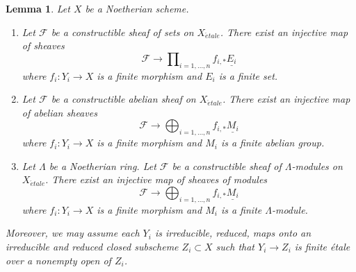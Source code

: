 \documentclass{amsart}
\theoremstyle{plain}
\newtheorem{lemma}[subsection]{Lemma}
\theoremstyle{definition}
\theoremstyle{remark}
\numberwithin{equation}{subsection}
\def\etale{{\acute{e}tale}}
\begin{document}
\begin{lemma}
\label{lemma-constructible-maps-into-constant}
Let $X$ be a Noetherian scheme.
\begin{enumerate}
\item Let $\mathcal{F}$ be a constructible sheaf of sets on $X_\etale$.
There exist an injective map of sheaves
$$
\mathcal{F} \longrightarrow
\prod\nolimits_{i = 1, \ldots, n} f_{i, *}\underline{E_i}
$$
where $f_i : Y_i \to X$ is a finite morphism and $E_i$ is a finite set.
\item Let $\mathcal{F}$ be a constructible abelian sheaf on $X_\etale$.
There exist an injective map of abelian sheaves
$$
\mathcal{F} \longrightarrow
\bigoplus\nolimits_{i = 1, \ldots, n} f_{i, *}\underline{M_i}
$$
where $f_i : Y_i \to X$ is a finite morphism and
$M_i$ is a finite abelian group.
\item Let $\Lambda$ be a Noetherian ring.
Let $\mathcal{F}$ be a constructible sheaf of $\Lambda$-modules on $X_\etale$.
There exist an injective map of sheaves of modules
$$
\mathcal{F} \longrightarrow
\bigoplus\nolimits_{i = 1, \ldots, n} f_{i, *}\underline{M_i}
$$
where $f_i : Y_i \to X$ is a finite morphism and
$M_i$ is a finite $\Lambda$-module.
\end{enumerate}
Moreover, we may assume each $Y_i$ is irreducible, reduced, maps onto
an irreducible and reduced closed subscheme $Z_i \subset X$ such that
$Y_i \to Z_i$ is finite \'etale over a nonempty open of $Z_i$.
\end{lemma}
\end{document}
